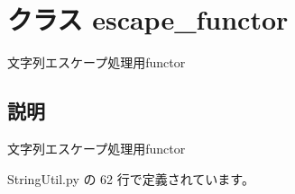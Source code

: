 \section{クラス escape\_\-functor}
\label{classsource__py_1_1_string_util_1_1escape__functor}
文字列エスケープ処理用functor  




\subsection{説明}
文字列エスケープ処理用functor 

 StringUtil.py の 62 行で定義されています。